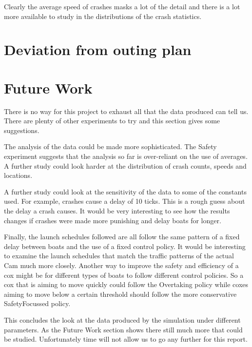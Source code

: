  Clearly the average speed of crashes masks a lot of the detail and there is a lot more available to study in the distributions of the crash statistics.
  
\section{Deviation from outing plan}

\section{Future Work}
There is no way for this project to exhaust all that the data produced can tell us. There are plenty of other experiments to try and this section gives some suggestions.

The analysis of the data could be made more sophisticated. The Safety experiment suggests that the analysis so far is over-reliant on the use of averages. A further study could look harder at the distribution of crash counts, speeds and locations.

A further study could look at the sensitivity of the data to some of the constants used. For example, crashes cause a delay of 10 ticks. This is a rough guess about the delay a crash causes. It would be very interesting to see how the results changes if crashes were made more punishing and delay boats for longer.

Finally, the launch schedules followed are all follow the same pattern of a fixed delay between boats and the use of a fixed control policy. It would be interesting to examine the launch schedules that match the traffic patterns of the actual Cam much more closely. Another way to improve the safety and efficiency of a cox might be for different types of boats to follow different control policies. So a cox that is aiming to move quickly could follow the Overtaking policy while coxes aiming to move below a certain threshold should follow the more conservative SafetyFocussed policy.

This concludes the look at the data produced by the simulation under different parameters. As the Future Work section shows there still much more that could be studied. Unfortunately time will not allow us to go any further for this report.